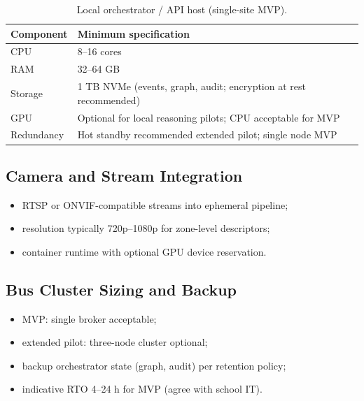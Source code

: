 \begin{table}[htbp]
  \centering
  \caption{Local orchestrator / API host (single-site MVP).}
  \label{tab:orchestrator-hardware-appendix}
  \small
  \begin{tabular}{@{}ll@{}}
    \toprule
    Component & Minimum specification \\
    \midrule
    CPU & 8--16 cores \\
    RAM & 32--64 GB \\
    Storage & 1 TB NVMe (events, graph, audit; encryption at rest recommended) \\
    GPU & Optional for local reasoning pilots; CPU acceptable for MVP \\
    Redundancy & Hot standby recommended extended pilot; single node MVP \\
    \bottomrule
  \end{tabular}
\end{table}

\subsection{Camera and Stream Integration}

\begin{itemize}[noitemsep]
  \item RTSP or ONVIF-compatible streams into ephemeral pipeline;
  \item resolution typically 720p--1080p for zone-level descriptors;
  \item container runtime with optional GPU device reservation.
\end{itemize}

\subsection{Bus Cluster Sizing and Backup}

\begin{itemize}[noitemsep]
  \item MVP: single broker acceptable;
  \item extended pilot: three-node cluster optional;
  \item backup orchestrator state (graph, audit) per retention policy;
  \item indicative RTO 4--24 h for MVP (agree with school IT).
\end{itemize}
